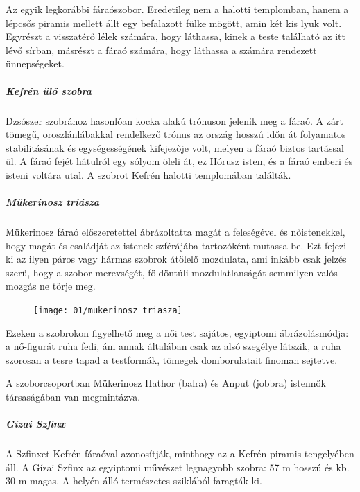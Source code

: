 	Az egyik legkorábbi fáraószobor. Eredetileg nem a halotti templomban, hanem a lépcsős piramis mellett állt egy befalazott fülke mögött, amin két kis lyuk volt. Egyrészt a visszatérő lélek számára, hogy láthassa, kinek a teste található az itt lévő sírban, másrészt a fáraó számára, hogy láthassa a számára rendezett ünnepségeket.
	
	\subparagraph{Kefrén ülő szobra}
	Dzsószer szobrához hasonlóan kocka alakú trónuson jelenik meg a fáraó. A zárt tömegű, oroszlánlábakkal rendelkező trónus az ország hosszú időn át folyamatos stabilitásának és egységességének kifejezője volt, melyen a fáraó biztos tartással ül. A fáraó fejét hátulról egy sólyom öleli át, ez Hórusz isten, és a fáraó emberi és isteni voltára utal. A szobrot Kefrén halotti templomában találták.
	
	\subparagraph{Mükerinosz triásza}
	Mükerinosz fáraó előszeretettel ábrázoltatta magát a feleségével és nőistenekkel, hogy magát és családját az istenek szférájába tartozóként mutassa be. Ezt fejezi ki az ilyen páros vagy hármas szobrok átölelő mozdulata, ami inkább csak jelzés szerű, hogy a szobor merevségét, földöntúli mozdulatlanságát semmilyen valós mozgás ne törje meg.
	
	\begin{figure}
		\begin{tcolorbox}[enhanced,colframe=gray!50!white,
			colbacktitle=white!15!white,
			coltitle=gray!50!black,
			borderline={0.5mm}{0mm}{gray!15!white},
			borderline={0.5mm}{0mm}{gray!50!white,dashed},
			attach boxed title to top center={yshift=-2mm},
			boxed title style={boxrule=0.4pt},
			title=Mükerinosz triásza]{
				\texttt{[image: 01/mukerinosz\_triasza]}}
		\end{tcolorbox}
	\end{figure} 
	
	Ezeken a szobrokon figyelhető meg a női test sajátos, egyiptomi ábrázolásmódja: a nő-figurát ruha fedi, ám annak általában csak az alsó szegélye látszik, a ruha szorosan a tesre tapad a testformák, tömegek domborulatait finoman sejtetve.
	
	A szoborcsoportban Mükerinosz Hathor (balra) és Anput (jobbra) istennők társaságában van megmintázva.
	
	\subparagraph{Gízai Szfinx}
	A Szfinxet Kefrén fáraóval azonosítják, minthogy az a Kefrén-piramis tengelyében áll. A Gízai Szfinx az egyiptomi művészet legnagyobb szobra: 57 m hosszú és kb. 30 m magas. A helyén álló természetes sziklából faragták ki.
	
